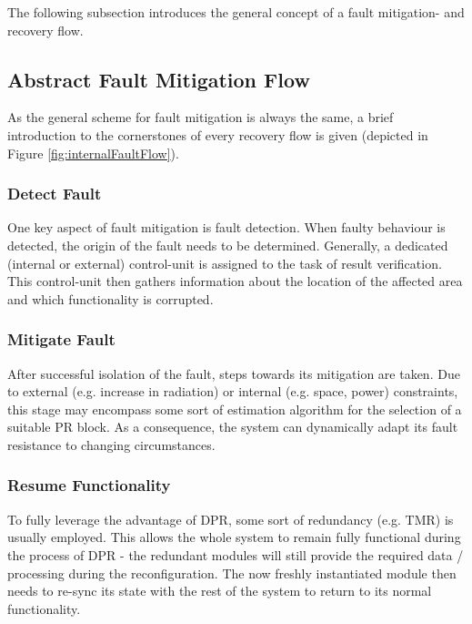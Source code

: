 The following subsection introduces the general concept of a fault mitigation- and recovery flow. 

\subsection{Abstract Fault Mitigation Flow}\label{AbstractFaultMitigationFlow}
As the general scheme for fault mitigation is always the same, a brief introduction to the cornerstones of every recovery flow is given (depicted in Figure \ref{fig:internalFaultFlow}). 

\subsubsection{Detect Fault}
    One key aspect of fault mitigation is fault detection. 
    When faulty behaviour is detected, the origin of the fault needs to be determined.
    Generally, a dedicated (internal or external) control-unit is assigned to the task of result verification.
    This control-unit then gathers information about the location of the affected area and which functionality is corrupted.
\subsubsection{Mitigate Fault}
    After successful isolation of the fault, steps towards its mitigation are taken.
    Due to external (e.g. increase in radiation) or internal (e.g. space, power) constraints, this stage may encompass some sort of estimation algorithm for the selection of a suitable \gls{PR} block.
    As a consequence, the system can dynamically adapt its fault resistance to changing circumstances.
\subsubsection{Resume Functionality}
    To fully leverage the advantage of \gls{DPR}, some sort of redundancy (e.g. \gls{TMR}) is usually employed.
    This allows the whole system to remain fully functional during the process of \gls{DPR} - the redundant modules will still provide the required data / processing during the reconfiguration. 
    The now freshly instantiated module then needs to re-sync its state with the rest of the system to return to its normal functionality.
